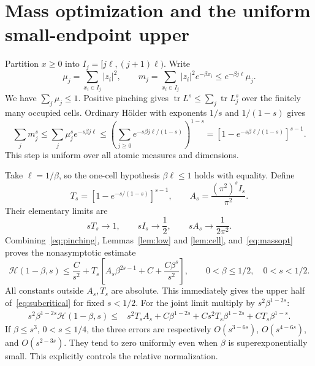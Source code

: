 \documentclass[11pt]{article}
\numberwithin{equation}{section}
\newcommand{\tr}{\operatorname{tr}}
\newcommand{\cH}{\mathcal H}
\begin{document}
\section{Mass optimization and the uniform small-endpoint upper}

Partition $x\ge0$ into $I_j=[j\ell,(j+1)\ell)$. Write
\[
 \mu_j=\sum_{x_i\in I_j}|z_i|^2,\qquad
 m_j=\sum_{x_i\in I_j}|z_i|^2e^{-\beta x_i}
                  \le e^{-\beta j\ell}\mu_j.
\]
We have $\sum_j\mu_j\le1$. Positive pinching gives
$\tr L^s\le\sum_j\tr L_j^s$ over the finitely many occupied cells.
Ordinary H\"older with exponents $1/s$ and $1/(1-s)$ gives
\begin{equation}\label{eq:massopt}
 \sum_jm_j^s\le\sum_j\mu_j^se^{-s\beta j\ell}
 \le\left(\sum_{j\ge0}e^{-s\beta j\ell/(1-s)}\right)^{1-s}
 =[1-e^{-s\beta\ell/(1-s)}]^{s-1}.
\end{equation}
This step is uniform over all atomic measures and dimensions.

Take $\ell=1/\beta$, so the one-cell hypothesis
$\beta\ell\le1$ holds with equality. Define
\begin{equation}\label{eq:AsTs}
 T_s=[1-e^{-s/(1-s)}]^{s-1},\qquad
 A_s=\frac{(\pi^2)^s I_s}{\pi^2}.
\end{equation}
Their elementary limits are
\begin{equation}\label{eq:TsIlimits}
 sT_s\longrightarrow1,\qquad sI_s\longrightarrow\frac12,
 \qquad sA_s\longrightarrow\frac1{2\pi^2}.
\end{equation}
Combining~\eqref{eq:pinching}, Lemmas~\ref{lem:low} and
\ref{lem:cell}, and~\eqref{eq:massopt} proves the nonasymptotic estimate
\begin{equation}\label{eq:uniformupper}
 \cH(1-\beta,s)\le\frac C{s^2}
       +T_s\left[A_s\beta^{2s-1}+C+\frac{C\beta^s}{s^2}\right],
 \qquad0<\beta\le1/2,\quad0<s<1/2.
\end{equation}
All constants outside $A_s,T_s$ are absolute. This immediately
gives the upper half of~\eqref{eq:subcritical} for fixed $s<1/2$.
For the joint limit multiply by $s^2\beta^{1-2s}$:
\begin{align}\label{eq:relativeupper}
 s^2\beta^{1-2s}\cH(1-\beta,s)
 \le {}&s^2T_sA_s+C\beta^{1-2s}
       +Cs^2T_s\beta^{1-2s}+CT_s\beta^{1-s}.
\end{align}
If $\beta\le s^3$, $0<s\le1/4$, the three errors are respectively
$O(s^{3-6s})$, $O(s^{4-6s})$, and $O(s^{2-3s})$.
They tend to zero uniformly even when $\beta$ is superexponentially
small. This explicitly controls the relative normalization.
\end{document}
